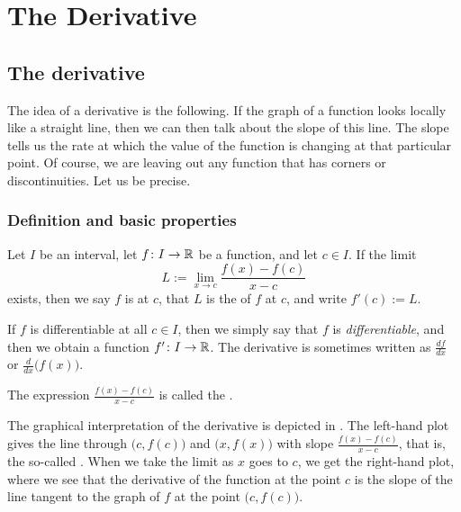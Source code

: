 \chapter{The Derivative} \label{der:chapter}


\section{The derivative}
\label{sec:der}


The idea of a derivative is the following.
If the graph of a function looks locally like a straight line,
then we can then talk about the slope of this line.
The slope tells us the rate at which 
the value of the function is changing at that particular point.
Of course, we are leaving out any function that has corners or
discontinuities.  
Let us be precise.

\subsection{Definition and basic properties}

\begin{defn}
Let $I$ be an interval, let
$f \colon I \to {\mathbb{R}}$ be a function, and let $c \in I$.  If 
the limit
\begin{equation*}
L := \lim_{x \to c} \frac{f(x)-f(c)}{x-c} 
\end{equation*}
exists, then we say $f$ is
\emph{} at
$c$, that $L$ is the \emph{} of $f$ at $c$,
and write $f'(c) := L$.

\medskip

If $f$ is differentiable at all $c \in I$, then we simply say that
$f$ is \emph{differentiable}, and then we obtain a function
$f' \colon I \to {\mathbb{R}}$.
The derivative is sometimes written as $\frac{df}{dx}$ or
$\frac{d}{dx}\bigl( f(x) \bigr)$.

\medskip

The expression $\frac{f(x)-f(c)}{x-c}$ is called the
\emph{}.
\end{defn}

The graphical interpretation of the derivative is  depicted in
.  The left-hand plot gives the line through
$\bigl(c,f(c)\bigr)$
and $\bigl(x,f(x)\bigr)$ with slope
$\frac{f(x)-f(c)}{x-c}$, that is,
the so-called \emph{}.  When we take the limit as $x$ goes to $c$,
we get the right-hand plot, where we see
that the derivative of the function
at the point $c$ is the slope of the line tangent to the graph of $f$
at the point $\bigl(c,f(c)\bigr)$.

